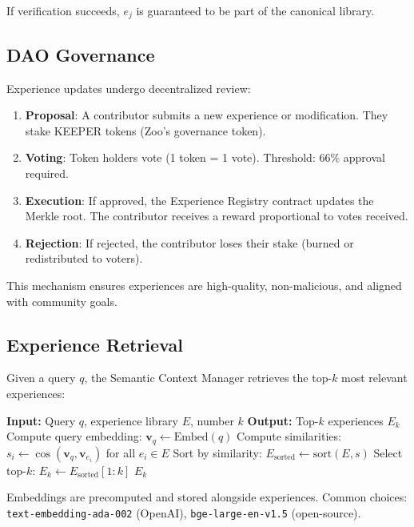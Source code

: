 If verification succeeds, $e_j$ is guaranteed to be part of the canonical library.

\subsection{DAO Governance}

Experience updates undergo decentralized review:

\begin{enumerate}
\item \textbf{Proposal}: A contributor submits a new experience or modification. They stake KEEPER tokens (Zoo's governance token).
\item \textbf{Voting}: Token holders vote (1 token = 1 vote). Threshold: 66\% approval required.
\item \textbf{Execution}: If approved, the Experience Registry contract updates the Merkle root. The contributor receives a reward proportional to votes received.
\item \textbf{Rejection}: If rejected, the contributor loses their stake (burned or redistributed to voters).
\end{enumerate}

This mechanism ensures experiences are high-quality, non-malicious, and aligned with community goals.

\subsection{Experience Retrieval}

Given a query $q$, the Semantic Context Manager retrieves the top-$k$ most relevant experiences:

\begin{algorithm}[H]
\caption{Experience Retrieval}
\begin{algorithmic}[1]
\STATE \textbf{Input:} Query $q$, experience library $E$, number $k$
\STATE \textbf{Output:} Top-$k$ experiences $E_k$
\STATE Compute query embedding: $\mathbf{v}_q \leftarrow \text{Embed}(q)$
\STATE Compute similarities: $s_i \leftarrow \cos(\mathbf{v}_q, \mathbf{v}_{e_i})$ for all $e_i \in E$
\STATE Sort by similarity: $E_{\text{sorted}} \leftarrow \text{sort}(E, s)$
\STATE Select top-$k$: $E_k \leftarrow E_{\text{sorted}}[1:k]$
\RETURN $E_k$
\end{algorithmic}
\end{algorithm}

Embeddings are precomputed and stored alongside experiences. Common choices: \texttt{text-embedding-ada-002} (OpenAI), \texttt{bge-large-en-v1.5} (open-source).

